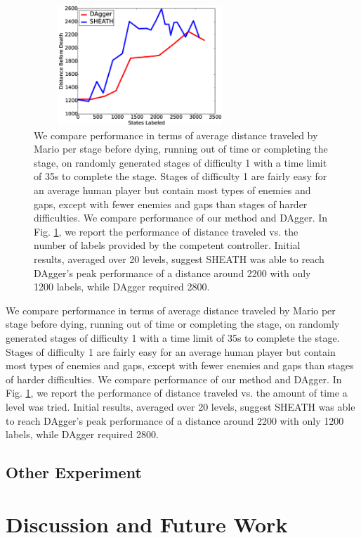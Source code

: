 \documentclass[10pt, conference]{ieeeconf}      %
\begin{document}
\begin{figure}[ht]
\centering

\includegraphics[width=8cm, height = 4.5cm]{figures/dagger_sheath_mario.eps}


\caption{We compare performance in terms of average distance traveled by Mario per stage before dying, running out of time or completing the stage, on randomly generated stages of difficulty 1 with a time limit of 35s to complete the stage.  Stages of difficulty 1 are fairly easy for an average human player but contain most types of enemies and gaps, except with fewer enemies and gaps than stages of harder difficulties. We compare performance of our method and DAgger. In Fig. \ref{fig:mario_results}, we report the performance of distance traveled vs. the number of labels provided by the competent controller. Initial results, averaged over 20 levels, suggest SHEATH was able to reach DAgger's peak performance of a distance around 2200 with only 1200 labels, while DAgger required 2800.   }
\label{fig:mario_results}
\end{figure}

We compare performance in terms of average distance traveled by Mario per stage before dying, running out of time or completing the stage, on randomly generated stages of difficulty 1 with a time limit of 35s to complete the stage.  Stages of difficulty 1 are fairly easy for an average human player but contain most types of enemies and gaps, except with fewer enemies and gaps than stages of harder difficulties. We compare performance of our method and DAgger. In Fig. \ref{fig:mario_results}, we report the performance of distance traveled vs. the amount of time a level was tried.  Initial results, averaged over 20 levels,  suggest SHEATH was able to reach DAgger's peak performance of a distance around 2200 with only 1200 labels, while DAgger required 2800.  



\subsection{Other Experiment}


\section{Discussion and Future Work}




\end{document}
